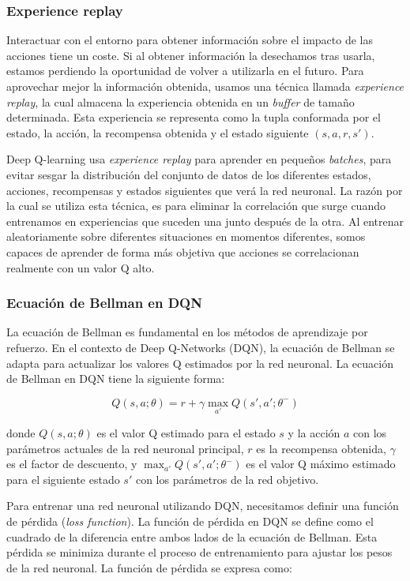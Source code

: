 \subsubsection{Experience replay}
Interactuar con el entorno para obtener información sobre el impacto de las acciones tiene un coste. Si al obtener información la desechamos tras usarla, estamos perdiendo la oportunidad de volver a utilizarla en el futuro. Para aprovechar mejor la información obtenida, usamos una técnica llamada \textit{experience replay}, la cual almacena la experiencia obtenida en un \textit{buffer} de tamaño determinada. Esta experiencia se representa como la tupla conformada por el estado, la acción, la recompensa obtenida y el estado siguiente \((s,a,r,s')\). 

Deep Q-learning usa \textit{experience replay} para aprender en pequeños \textit{batches}, para evitar sesgar la distribución del conjunto de datos de los diferentes estados, acciones, recompensas y estados siguientes que verá la red neuronal. La razón por la cual se utiliza esta técnica, es para eliminar la correlación que surge cuando entrenamos en experiencias que suceden una junto después de la otra. Al entrenar aleatoriamente sobre diferentes situaciones en momentos diferentes, somos capaces de aprender de forma más objetiva que acciones se correlacionan realmente con un valor Q alto.

\subsubsection{Ecuación de Bellman en DQN}

La ecuación de Bellman es fundamental en los métodos de aprendizaje por refuerzo. En el contexto de Deep Q-Networks (DQN), la ecuación de Bellman se adapta para actualizar los valores Q estimados por la red neuronal. La ecuación de Bellman en DQN tiene la siguiente forma:


\[
Q(s, a; \theta) = r + \gamma \max_{a'} Q(s', a'; \theta^{-})
\]


donde \( Q(s, a; \theta) \) es el valor Q estimado para el estado \( s \) y la acción \( a \) con los parámetros actuales de la red neuronal principal, \( r \) es la recompensa obtenida, \( \gamma \) es el factor de descuento, y \( \max_{a'} Q(s', a'; \theta^{-}) \) es el valor Q máximo estimado para el siguiente estado \( s' \) con los parámetros de la red objetivo.

Para entrenar una red neuronal utilizando DQN, necesitamos definir una función de pérdida (\textit{loss function}). La función de pérdida en DQN se define como el cuadrado de la diferencia entre ambos lados de la ecuación de Bellman. Esta pérdida se minimiza durante el proceso de entrenamiento para ajustar los pesos de la red neuronal. La función de pérdida se expresa como:

